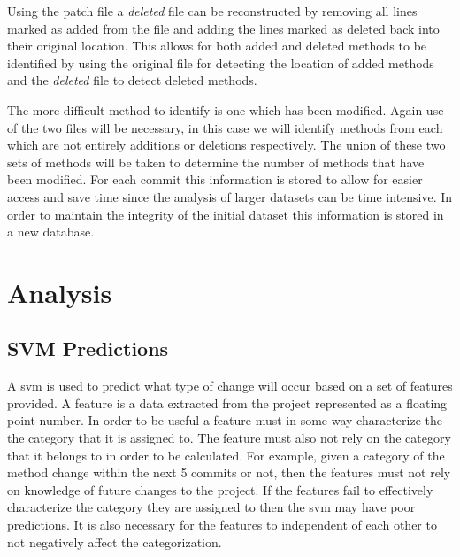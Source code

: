 Using the patch file a \textit{deleted} file can be reconstructed by removing all lines marked as added from the file and adding the lines marked as deleted back into their original location. This allows for both added and deleted methods to be identified by using the original file for detecting the location of added methods and the \textit{deleted} file to detect deleted methods.


The more difficult method to identify is one which has been modified. Again use of the two files will be necessary, in this case we will identify methods from each which are not entirely additions or deletions respectively. The union of these two sets of methods will be taken to determine the number of methods that have been modified. For each commit this information is stored to allow for easier access and save time since the analysis of larger datasets can be time intensive. In order to maintain the integrity of the initial dataset this information is stored in a new database.



\section{Analysis}
\label{sec:analysis}

\subsection{SVM Predictions}
\label{subsec:svm_prediction}

A \gls{svm} is used to predict what type of change will occur based on a set of features provided. A feature is a data extracted from the project represented as a floating point number. In order to be useful a feature must in some way characterize the the category that it is assigned to. The feature must also not rely on the category that it belongs to in order to be calculated. For example, given a category of the method change within the next 5 commits or not, then the features must not rely on knowledge of future changes to the project. If the features fail to effectively characterize the category they are assigned to then the \gls{svm} may have poor predictions. It is also necessary for the features to independent of each other to not negatively affect the categorization.

